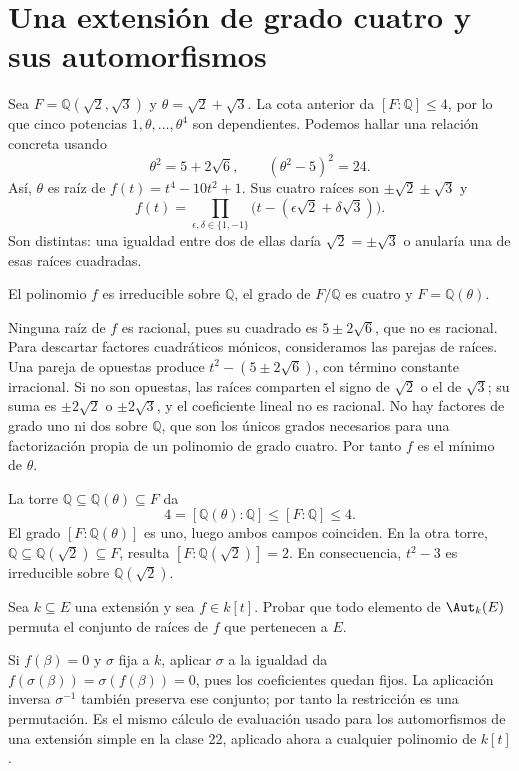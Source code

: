 \section{Una extensión de grado cuatro y sus automorfismos}
Sea $F=\mathbb Q(\sqrt2,\sqrt3)$ y $\theta=\sqrt2+\sqrt3$. La cota anterior da $[F:\mathbb Q]\leq4$, por lo que cinco potencias $1,\theta,\ldots,\theta^4$ son dependientes. Podemos hallar una relación concreta usando
\[
\theta^2=5+2\sqrt6,\qquad (\theta^2-5)^2=24.
\]
Así, $\theta$ es raíz de $f(t)=t^4-10t^2+1$. Sus cuatro raíces son $\pm\sqrt2\pm\sqrt3$ y
\[
f(t)=\prod_{\epsilon,\delta\in\{1,-1\}}
\bigl(t-(\epsilon\sqrt2+\delta\sqrt3)\bigr).
\]
Son distintas: una igualdad entre dos de ellas daría $\sqrt2=\pm\sqrt3$ o anularía una de esas raíces cuadradas.

\begin{ejem}\label{ejem:C23-bicuadratica}
El polinomio $f$ es irreducible sobre $\mathbb Q$, el grado de $F/\mathbb Q$ es cuatro y $F=\mathbb Q(\theta)$.

Ninguna raíz de $f$ es racional, pues su cuadrado es $5\pm2\sqrt6$, que no es racional. Para descartar factores cuadráticos mónicos, consideramos las parejas de raíces. Una pareja de opuestas produce $t^2-(5\pm2\sqrt6)$, con término constante irracional. Si no son opuestas, las raíces comparten el signo de $\sqrt2$ o el de $\sqrt3$; su suma es $\pm2\sqrt2$ o $\pm2\sqrt3$, y el coeficiente lineal no es racional. No hay factores de grado uno ni dos sobre $\mathbb Q$, que son los únicos grados necesarios para una factorización propia de un polinomio de grado cuatro. Por tanto $f$ es el mínimo de $\theta$.

La torre $\mathbb Q\subseteq\mathbb Q(\theta)\subseteq F$ da
\[
4=[\mathbb Q(\theta):\mathbb Q]\leq[F:\mathbb Q]\leq4.
\]
El grado $[F:\mathbb Q(\theta)]$ es uno, luego ambos campos coinciden. En la otra torre, $\mathbb Q\subseteq\mathbb Q(\sqrt2)\subseteq F$, resulta $[F:\mathbb Q(\sqrt2)]=2$. En consecuencia, $t^2-3$ es irreducible sobre $\mathbb Q(\sqrt2)$.
\end{ejem}

\begin{ejer}\label{ejer:C23-raices-aut}
Sea $k\subseteq E$ una extensión y sea $f\in k[t]$. Probar que todo elemento de $\Aut_k(E)$ permuta el conjunto de raíces de $f$ que pertenecen a $E$.
\end{ejer}
\begin{sol}
Si $f(\beta)=0$ y $\sigma$ fija a $k$, aplicar $\sigma$ a la igualdad da $f(\sigma(\beta))=\sigma(f(\beta))=0$, pues los coeficientes quedan fijos. La aplicación inversa $\sigma^{-1}$ también preserva ese conjunto; por tanto la restricción es una permutación. Es el mismo cálculo de evaluación usado para los automorfismos de una extensión simple en la clase 22, aplicado ahora a cualquier polinomio de $k[t]$.
\end{sol}

